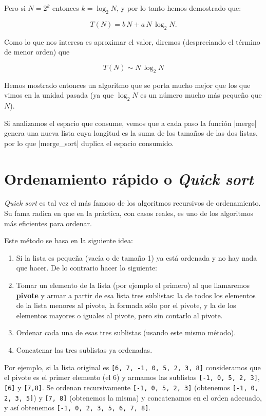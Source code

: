 Pero si $N = 2^k$ entonces $k=\log_2N$, y por lo tanto hemos demostrado
que:

\begin{equation}
T(N) = b \, N + a \, N \, \log_2 N.
\end{equation}

Como lo que nos interesa es aproximar el valor, diremos (despreciando el
término de menor orden) que

$$ T(N) \sim N \, \log_2 N $$

Hemos mostrado entonces
un algoritmo que se porta mucho mejor que los que vimos en la unidad
pasada (ya que $\log_2 N$ es un número mucho más pequeño que $N$).

Si analizamos el espacio que consume, vemos que a cada paso la función |merge|
genera una nueva lista cuya longitud es la suma de los tamaños de las dos
listas, por lo que |merge_sort| duplica el espacio consumido.

\section{Ordenamiento rápido o {\it Quick sort}}

{\it Quick sort} es tal vez el más famoso de los algoritmos recursivos de ordenamiento.
Su fama radica en que en la práctica, con casos reales, es uno de los
algoritmos más eficientes para ordenar.

Este método se basa en la siguiente idea:

\begin{enumerate}
\item Si la lista es pequeña (vacía o de tamaño 1) ya está ordenada y
no hay nada que hacer. De lo contrario hacer lo siguiente:

\item Tomar un elemento de la lista (por ejemplo el primero) al que
llamaremos {\bf pivote} y armar a partir de esa lista tres sublistas: la de
todos los elementos de la lista menores al pivote, la formada sólo por el
pivote, y la de los elementos mayores o iguales al pivote, pero sin
contarlo al pivote.

\item Ordenar cada una de esas tres sublistas (usando este mismo método).

\item Concatenar las tres sublistas ya ordenadas.
\end{enumerate}

Por ejemplo, si la lista original es \lstinline+[6, 7, -1, 0, 5, 2, 3, 8]+
consideramos que el pivote es el primer elemento (el 6) y armamos las
sublistas \lstinline+[-1, 0, 5, 2, 3]+, \lstinline+[6]+ y
\lstinline+[7,8]+. Se ordenan recursivamente \lstinline+[-1, 0, 5, 2, 3]+
(obtenemos \lstinline+[-1, 0, 2, 3, 5]+) y \lstinline+[7, 8]+ (obtenemos la
misma) y concatenamos en el orden adecuado, y así obtenemos
\lstinline+[-1, 0, 2, 3, 5, 6, 7, 8]+.

